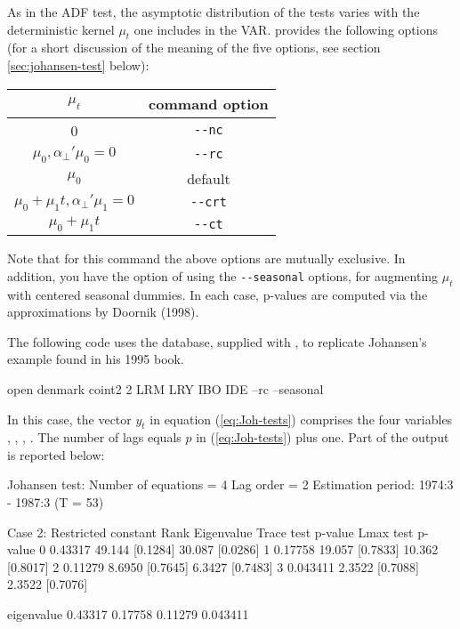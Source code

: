 As in the ADF test, the asymptotic distribution of the tests varies
with the deterministic kernel $\mu_t$ one includes in the VAR.
 provides the following options (for a short discussion of
the meaning of the five options, see section \ref{sec:johansen-test} below):
\begin{center}
  \begin{tabular}{cc}
    \hline
    $\mu_t$ & command option \\
    \hline
    0 & \verb|--nc| \\
    $\mu_0, \alpha_{\perp}'\mu_0 = 0 $ &  \verb|--rc| \\
    $\mu_0$ &  default \\
    $\mu_0 + \mu_1 t , \alpha_{\perp}'\mu_1 = 0$ &  \verb|--crt| \\
    $\mu_0 + \mu_1 t$ &  \verb|--ct| \\
    \hline
  \end{tabular}
\end{center}
Note that for this command the above options are mutually exclusive.
In addition, you have the option of using the \verb|--seasonal|
options, for augmenting $\mu_t$ with centered seasonal dummies.  In
each case, p-values are computed via the approximations by Doornik
(1998).

The following code uses the  database, supplied with
, to replicate Johansen's example found in his 1995 book.
\begin{code}
  open denmark
  coint2 2 LRM LRY IBO IDE --rc --seasonal
\end{code}
In this case, the vector $y_t$ in equation (\ref{eq:Joh-tests})
comprises the four variables , , ,
. The number of lags equals $p$ in (\ref{eq:Joh-tests}) plus
one. Part of the output is reported below:
\begin{center}
\begin{code}
Johansen test:
Number of equations = 4
Lag order = 2
Estimation period: 1974:3 - 1987:3 (T = 53)

Case 2: Restricted constant
Rank Eigenvalue Trace test p-value   Lmax test  p-value
   0    0.43317     49.144 [0.1284]     30.087 [0.0286]
   1    0.17758     19.057 [0.7833]     10.362 [0.8017]
   2    0.11279     8.6950 [0.7645]     6.3427 [0.7483]
   3   0.043411     2.3522 [0.7088]     2.3522 [0.7076]

eigenvalue     0.43317      0.17758      0.11279     0.043411 
\end{code}
\end{center}


